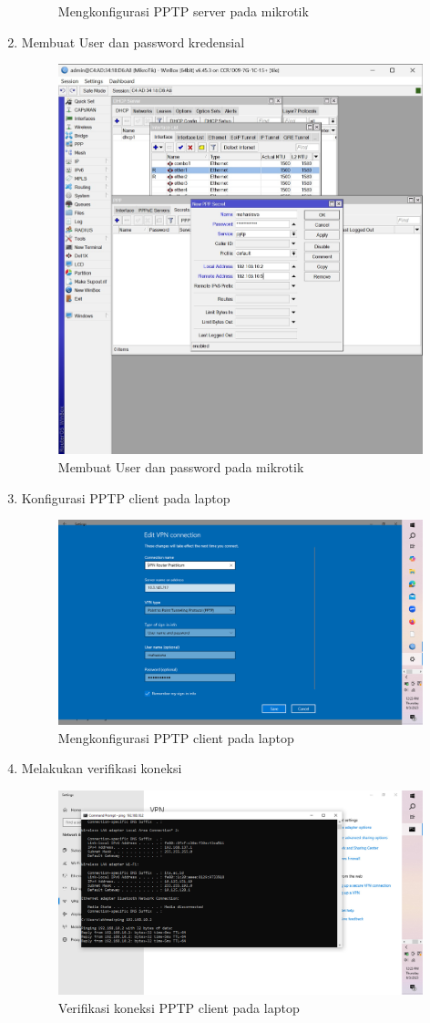 \begin{enumerate}
\begin{figure}[H]
        \caption{Mengkonfigurasi PPTP server pada mikrotik}
        \label{fig:PPTP-server-mikrotik}
    \end{figure}
    \item Membuat User dan password kredensial
    \begin{figure}[H]
        \centering
        \includegraphics[width=0.5\linewidth]{gambar8.jpeg}
        \caption{Membuat User dan password pada mikrotik}
        \label{fig:User-password-mikrotik}
    \end{figure}
    \item Konfigurasi PPTP client pada laptop
    \begin{figure}[H]
        \centering
        \includegraphics[width=0.5\linewidth]{gambar9.jpeg}
        \caption{Mengkonfigurasi PPTP client pada laptop}
        \label{fig:PPTP-client-laptop}
    \end{figure}
    \item Melakukan verifikasi koneksi 
    \begin{figure}[H]
        \centering
        \includegraphics[width=0.5\linewidth]{gambar10.jpeg}
        \caption{Verifikasi koneksi PPTP client pada laptop}
        \label{fig:Verifikasi-koneksi-laptop}
    \end{figure}


\end{enumerate}
